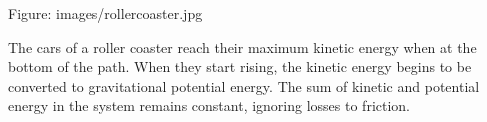 \documentclass{book}
\begin{document}
	Figure: images/rollercoaster.jpg
	
	The cars of a roller coaster reach their maximum kinetic energy when at the bottom of the path. When they start rising, the kinetic energy begins to be converted to gravitational potential energy. The sum of kinetic and potential energy in the system remains constant, ignoring losses to friction.
	
	
\end{document}
